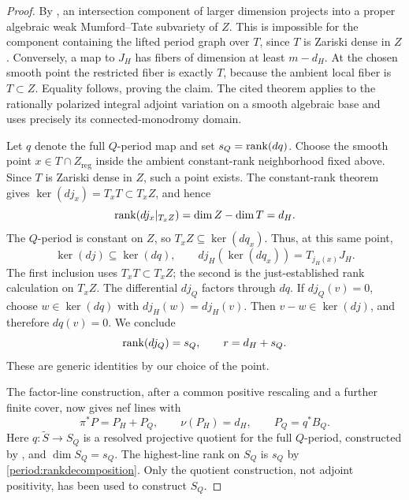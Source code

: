 \begin{proof}
By \cite[Theorem~1.1]{BakkerTsimermanAxSchanuel}, an intersection
component of larger dimension projects into a proper algebraic weak
Mumford--Tate subvariety of $Z$.  This is impossible for the component
containing the lifted period graph over $T$, since $T$ is Zariski
dense in $Z$.  Conversely, a map
to $J_H$ has fibers of dimension at least $m-d_H$.  At the chosen
smooth point the restricted fiber is exactly $T$, because the
ambient local fiber is $T\subset Z$.  Equality follows, proving the
claim.  The cited theorem applies to the rationally polarized
integral adjoint variation on a smooth algebraic base and uses
precisely its connected-monodromy domain.

Let $q$ denote the full $Q$-period map and set
$s_Q=\operatorname{rank}(dq)$. Choose the smooth point $x\in T\cap Z_{\mathrm{reg}}$
inside the ambient constant-rank neighborhood fixed above. Since
$T$ is Zariski dense in $Z$, such a point exists. The constant-rank
theorem gives $\ker(dj_x)=T_xT\subset T_xZ$, and hence
\[
 \operatorname{rank}(dj_x|_{T_xZ})=\dim Z-\dim T=d_H.
\]
The $Q$-period is constant on $Z$, so $T_xZ\subseteq\ker(dq_x)$.
Thus, at this same point,
\[
 \ker(dj)\subseteq\ker(dq),\qquad
             dj_H(\ker(dq_x))=T_{j_H(x)}J_H.
\]
The first inclusion uses $T_xT\subset T_xZ$; the second is the
just-established rank calculation on $T_xZ$.
The differential $dj_Q$ factors through $dq$.  If $dj_Q(v)=0$,
choose $w\in\ker(dq)$ with $dj_H(w)=dj_H(v)$.  Then
$v-w\in\ker(dj)$, and therefore $dq(v)=0$.  We conclude
\begin{equation}
\label{period:rankdecomposition}
       \operatorname{rank}(dj_Q)=s_Q,\qquad r=d_H+s_Q.
\end{equation}
These are generic identities by our choice of the point.

The factor-line construction, after a common positive rescaling
and a further finite cover, now gives nef lines with
\begin{equation}
\label{period:linedecomposition}
       \pi^*P=P_H+P_Q,\qquad
       \nu(P_H)=d_H,
       \qquad P_Q=q^*B_Q.
\end{equation}
Here $q:\widetilde S\to S_Q$ is a resolved projective quotient
for the full $Q$-period, constructed by
, and $\dim S_Q=s_Q$.  The highest-line
rank on $S_Q$ is $s_Q$ by
\eqref{period:rankdecomposition}.  Only the quotient construction,
not adjoint positivity, has been used to construct $S_Q$.


\end{proof}
